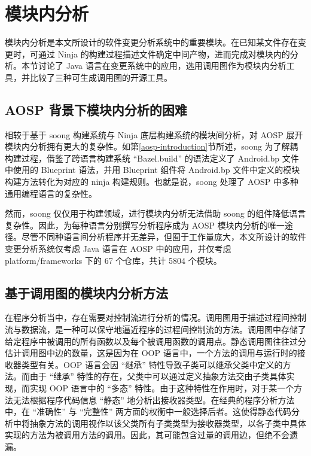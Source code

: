 \section{模块内分析}\label{intramodule-analysis}

模块内分析是本文所设计的软件变更分析系统中的重要模块。在已知某文件存在变更时，可通过 Ninja 的构建过程描述文件确定中间产物，进而完成对模块内的分析。本节讨论了 Java 语言在变更系统中的应用，选用调用图作为模块内分析工具，并比较了三种可生成调用图的开源工具。

\subsection{AOSP 背景下模块内分析的困难}

相较于基于 soong 构建系统与 Ninja 底层构建系统的模块间分析，对 AOSP 展开模块内分析拥有更大的复杂性。如第\ref{aosp-introduction}节所述，soong 为了解耦构建过程，借鉴了跨语言构建系统 “Bazel.build” 的语法定义了 Android.bp 文件中使用的 Blueprint 语法，并用 Blueprint 组件将 Android.bp 文件中定义的模块构建方法转化为对应的 ninja 构建规则。也就是说，soong 处理了 AOSP 中多种通用编程语言的复杂性。

然而，soong 仅仅用于构建领域，进行模块内分析无法借助 soong 的组件降低语言复杂性。因此，为每种语言分别撰写分析程序成为 AOSP 模块内分析的唯一途径。尽管不同种语言间分析程序并无差异，但囿于工作量庞大，本文所设计的软件变更分析系统仅考虑 Java 语言在 AOSP 中的应用，并仅考虑 platform/frameworks 下的 67 个仓库，共计 5804 个模块。

\subsection{基于调用图的模块内分析方法}

在程序分析当中，存在需要对控制流进行分析的情况。调用图用于描述过程间控制流与数据流，是一种可以保守地逼近程序的过程间控制流的方法。调用图中存储了给定程序中被调用的所有函数以及每个被调用函数的调用点\cite{MoellerS20}。静态调用图往往过分估计调用图中边的数量，这是因为在 OOP 语言中，一个方法的调用与运行时的接收器类型有关\cite{JSP19}。OOP 语言会因 “继承” 特性导致子类可以继承父类中定义的方法。而由于 “继承” 特性的存在，父类中可以通过定义抽象方法交由子类具体实现，而实现 OOP 语言中的 “多态” 特性。由于这种特性在作用时，对于某一个方法无法根据程序代码信息 “静态” 地分析出接收器类型。在经典的程序分析方法中，在 “准确性” 与 “完整性” 两方面的权衡中一般选择后者。这使得静态代码分析中将抽象方法的调用视作以该父类所有子类类型为接收器类型，以各子类中具体实现的方法为被调用方法的调用。因此，其可能包含过量的调用边，但绝不会遗漏。


